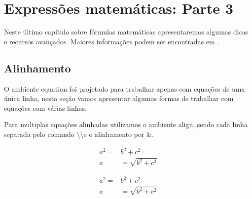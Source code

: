 % 
% 
% 
% 
% 
\chapter{Expressões matemáticas: Parte 3} \label{sch:latex:math3}
Neste último capítulo sobre fórmulas matemáticas apresentaremos algumas dicas e recursos avançados. Maiores informações podem ser encontradas em \cite{Graetzer:2007:MoreMath}.

\section{Alinhamento}
O ambiente \textsf{equation} foi projetado para trabalhar apenas com equações de uma única linha, nesta seção vamos apresentar algumas formas de trabalhar com equações com várias linhas.

Para multiplas equações alinhadas utilizamos o ambiente \textsf{align}, sendo cada linha separada pelo comando \textbackslash\textbackslash e o alinhamento por \&. \\
\begin{minipage}[t]{0.47\linewidth} \vspace{-8pt}
    \begin{latexcode}
        \begin{align}
            a^2 =& b^2 + c^2 \\
            a &= \sqrt{b^2 + c^2}
        \end{align}
    \end{latexcode}
\end{minipage} \hfill
\begin{minipage}[t]{0.47\linewidth} \vspace{0pt}
    \begin{align}
        a^2 =& b^2 + c^2 \\
        a &= \sqrt{b^2 + c^2}
    \end{align}
\end{minipage}

